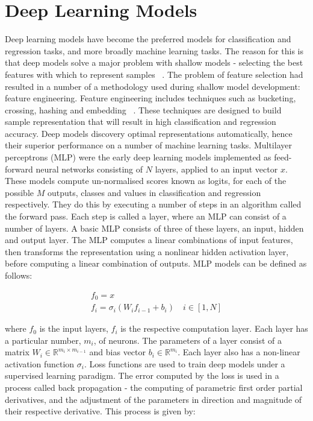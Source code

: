 \section{Deep Learning Models}

Deep learning models have become the preferred models for classification and regression tasks, and more broadly machine learning tasks. The reason for this is that deep models solve a major problem with shallow models - selecting the best features with which to represent samples ~\citep{Goodfellow-et-al-2016}. The problem of feature selection had resulted in a number of a methodology used during shallow model development: feature engineering. Feature engineering includes techniques such as bucketing, crossing, hashing and embedding ~\citep{murphy2012machine, Goodfellow-et-al-2016}. These techniques are designed to build sample representation that will result in high classification and regression accuracy. Deep models discovery optimal representations automatically, hence their superior performance on a number of machine learning tasks. \newline
Multilayer perceptrons (MLP) were the early deep learning models implemented as feed-forward neural networks consisting of $N$ layers, applied to an input vector $ x $. These models compute un-normalised scores known as logits, for each of the possible $ M $ outputs, classes and values in classification and regression respectively. They do this by executing a number of steps in an algorithm called the forward pass. Each step is called a layer, where an MLP can consist of a number of layers. A basic MLP consists of three of these layers, an input, hidden and output layer. The MLP computes a linear combinations of input features, then transforms the representation using a nonlinear hidden activation layer, before computing a linear combination of outputs. MLP models can be defined as follows:

\begin{subequations}
\begin{gather}
	f_0 = x \\
	f_i=\sigma_i(W_if_{i - 1} + b_i) \quad i \in [1, N]
\end{gather}
\end{subequations}

where $f_0$ is the input layers, $f_i$ is the respective computation layer. Each layer has a particular number,  $m_i$, of neurons. The parameters of a layer consist of a matrix $W_i \in \mathbb{R}^{m_i \times m_{i-1}}$ and bias vector $b_i \in  \mathbb{R}^{m_i}$. Each layer also has a non-linear activation function $\sigma_i$. \newline
Loss functions are used to train deep models under a supervised learning paradigm. The error computed by the loss is used in a process called back propagation - the computing of parametric first order partial derivatives, and the adjustment of the parameters in direction and magnitude of their respective derivative. This process is given by:


